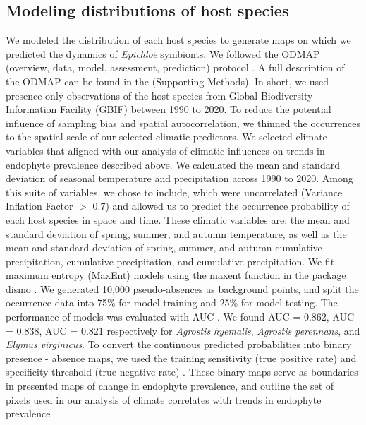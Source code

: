 \documentclass[11pt]{article}
\newcommand{\josh}[2]{{\color{orange}{#1}}\footnote{\textit{\color{orange}{#2}}}}
\begin{document}
\subsection*{Modeling distributions of host species}
We modeled the distribution of each host species to generate maps on which we predicted the dynamics of \emph{Epichloë} symbionts.
We followed the ODMAP (overview, data, model, assessment, prediction) protocol \citep{crossley2022opposing}.
A full description of the ODMAP can be found in the  (Supporting Methods). 
 In short, we used presence-only observations of the host species from Global Biodiversity Information Facility (GBIF) between 1990 to 2020.
To reduce the potential influence of sampling bias and spatial autocorrelation, we thinned the occurrences to the spatial scale  of our selected climatic predictors. 
We selected climate variables that aligned with our analysis of climatic influences on trends in endophyte prevalence described above.
We calculated the mean and standard deviation of seasonal temperature and precipitation across 1990 to 2020. 
Among this suite of variables, we chose to include, which were uncorrelated (Variance Inflation Factor $>$ 0.7) and allowed us to predict the occurrence probability of each host species in space and time.
These climatic variables are: the mean and standard deviation of spring, summer, and autumn temperature, as well as the mean and standard deviation of spring, summer, and autumn cumulative precipitation, cumulative precipitation, and cumulative precipitation.
We fit maximum entropy (MaxEnt) models using the maxent function in the package dismo \citep{hijmans2017package}. 
We generated 10,000 pseudo-absences as background points, and split the occurrence data into 75\% for model training and 25\% for model testing.
The performance of models was evaluated with AUC \citep{jimenez2012insights}. 
We found AUC = 0.862, AUC = 0.838, AUC = 0.821 respectively  for \emph{Agrostis hyemalis}, \emph{Agrostis perennans}, and \emph{Elymus virginicus}.
To convert the continuous predicted probabilities into binary presence - absence maps, we used the  training sensitivity (true positive rate) and specificity threshold (true negative rate) \citep{liu2005selecting}. 
These binary maps serve as boundaries in presented maps of change in endophyte prevalence, and outline the set of pixels used in our analysis of climate correlates with trends in endophyte prevalence
		
\end{document}
